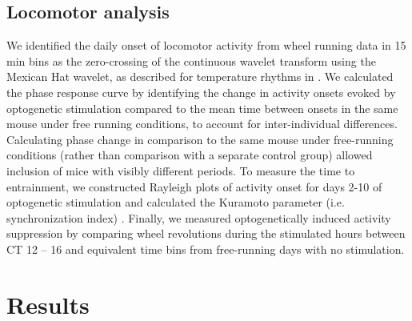 \subsection*{Locomotor analysis}
We identified the daily onset of locomotor activity from wheel running data in 15 min bins as the zero-crossing of the continuous wavelet transform using the Mexican Hat wavelet, as described for temperature rhythms in \cite{Leise2013}.
We calculated the phase response curve by identifying the change in activity onsets evoked by optogenetic stimulation compared to the mean time between onsets in the same mouse under free running conditions, to account for inter-individual differences.
Calculating phase change in comparison to the same mouse under free-running conditions (rather than comparison with a separate control group) allowed inclusion of mice with visibly different periods.
To measure the time to entrainment, we constructed Rayleigh plots of activity onset for days 2-10 of optogenetic stimulation and calculated the Kuramoto parameter (i.e. synchronization index) \cite{kuramoto1984}.
Finally, we measured optogenetically induced activity suppression by comparing wheel revolutions during the stimulated hours between CT 12 – 16 and equivalent time bins from free-running days with no stimulation.

\section{Results}

